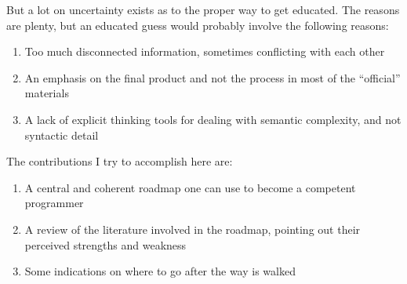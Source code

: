 But a lot on uncertainty exists as to the proper way to get educated. The
reasons are plenty, but an educated guess would probably involve the following
reasons:

\begin{enumerate}
    \item Too much disconnected information, sometimes conflicting with each other
    \item An emphasis on the final product and not the process in most of the
    ``official'' materials \cite{education:harvey__symbolic_programming_vs_AP_curriculum}
    \item A lack of explicit thinking tools for dealing with semantic
    complexity, and not syntactic detail\cite{education:felleisen__sicsc}
\end{enumerate}


The contributions I try to accomplish here are:

\begin{enumerate}
    \item A central and coherent roadmap one can use to become a competent
    programmer
    \item A review of the literature involved in the roadmap, pointing out their
    perceived strengths and weakness

    \item Some indications on where to go after the way is walked
\end{enumerate}
